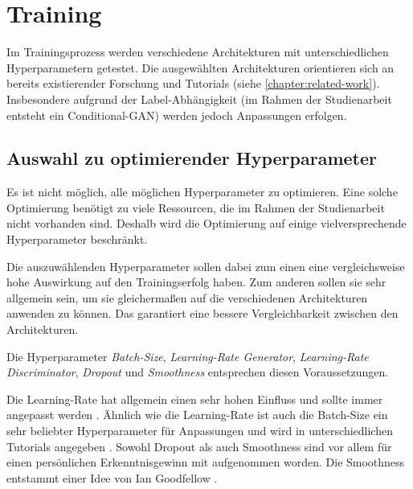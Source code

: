 \section{Training}
Im Trainingsprozess werden verschiedene Architekturen mit unterschiedlichen Hyperparametern getestet.
Die ausgewählten Architekturen orientieren sich an bereits existierender Forschung und Tutorials (siehe \cref{chapter:related-work}).
Insbesondere aufgrund der Label-Abhängigkeit (im Rahmen der Studienarbeit entsteht ein Conditional-GAN) werden jedoch Anpassungen erfolgen.


\subsection{Auswahl zu optimierender Hyperparameter}
Es ist nicht möglich, alle möglichen Hyperparameter zu optimieren.
Eine solche Optimierung benötigt zu viele Ressourcen, die im Rahmen der Studienarbeit nicht vorhanden sind.
Deshalb wird die Optimierung auf einige vielversprechende Hyperparameter beschränkt.
\newline

Die auszuwählenden Hyperparameter sollen dabei zum einen eine vergleichsweise hohe Auswirkung auf den Trainingserfolg haben.
Zum anderen sollen sie sehr allgemein sein, um sie gleichermaßen auf die verschiedenen Architekturen anwenden zu können.
Das garantiert eine bessere Vergleichbarkeit zwischen den Architekturen.
\newline

Die Hyperparameter \textit{Batch-Size}, \textit{Learning-Rate Generator}, \textit{Learning-Rate Discriminator}, \textit{Dropout} und \textit{Smoothness} entsprechen diesen Voraussetzungen.
\newline

Die Learning-Rate hat allgemein einen sehr hohen Einfluss und sollte immer angepasst werden \cite{learning-rate-most-important}.
Ähnlich wie die Learning-Rate ist auch die Batch-Size ein sehr beliebter Hyperparameter für Anpassungen und wird in unterschiedlichen Tutorials angegeben \cite{tutorial:tune-batch-size-analyticsvidhya, tutorial:tune-batch-size-machinelearningmastery} .
Sowohl Dropout als auch Smoothness sind vor allem für einen persönlichen Erkenntnisgewinn mit aufgenommen worden.
Die Smoothness entstammt einer Idee von Ian Goodfellow \cite{ian-goodfellow-onesided-label-smoothing}.


